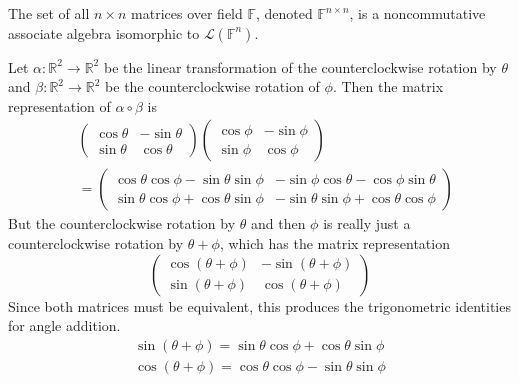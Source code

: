 	\begin{theorem}
	  \label{thm:algebra-of-matrices}
		The set of all $n \times n$ matrices over field $\mathbb{F}$, denoted $\mathbb{F}^{n \times n}$, is a noncommutative associate algebra isomorphic to $\mathcal{L}(\mathbb{F}^n)$. 
  \end{theorem}

	\begin{example}
	  \label{ex:trigonometric-identities-from-rotations}
    Let $\alpha: \mathbb{R}^2 \to \mathbb{R}^2$ be the linear transformation of the counterclockwise rotation by $\theta$ and $\beta: \mathbb{R}^2 \to \mathbb{R}^2$ be the counterclockwise rotation of $\phi$. Then the matrix representation of $\alpha \circ \beta$ is 
    \begin{align}
        & \begin{pmatrix}
      \cos{\theta} & - \sin{\theta} \\
      \sin{\theta} & \cos{\theta}
      \end{pmatrix} \begin{pmatrix}
      \cos{\phi} & - \sin{\phi} \\
      \sin{\phi} & \cos{\phi} 
      \end{pmatrix} \\
       & = \begin{pmatrix}
      \cos{\theta} \cos{\phi} - \sin{\theta} \sin{\phi} & - \sin{\phi} \cos{\theta} - \cos{\phi} \sin{\theta} \\
      \sin{\theta} \cos{\phi} + \cos{\theta} \sin{\phi} & - \sin{\theta} \sin{\phi} + \cos{\theta} \cos{\phi}
      \end{pmatrix}
    \end{align}
    But the counterclockwise rotation by $\theta$ and then $\phi$ is really just a counterclockwise rotation by $\theta + \phi$, which has the matrix representation
    \begin{equation}
      \begin{pmatrix}
      \cos{(\theta + \phi)} & - \sin{(\theta + \phi)} \\
      \sin{(\theta + \phi)} & \cos{(\theta + \phi)}
      \end{pmatrix}
    \end{equation}
    Since both matrices must be equivalent, this produces the trigonometric identities for angle addition.
    \begin{align*}
      \sin{(\theta + \phi)} = \sin{\theta} \cos{\phi} + \cos{\theta} \sin{\phi} \\
      \cos{(\theta + \phi)} = \cos{\theta} \cos{\phi} - \sin{\theta} \sin{\phi}
    \end{align*}
  \end{example}

